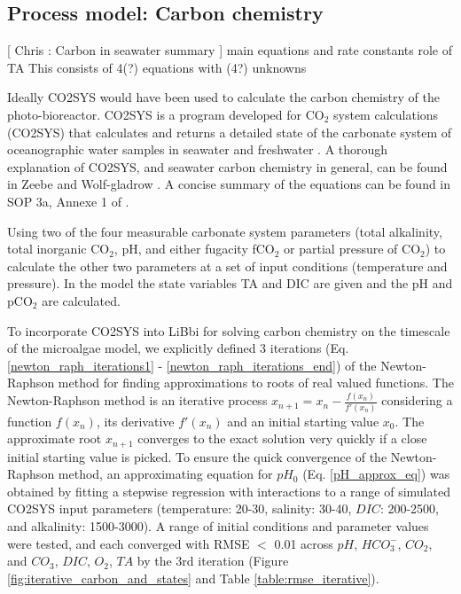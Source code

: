 \documentclass{ruthesis}
\begin{document}
\FloatBarrier
\subsection{Process model: Carbon chemistry}

[ Chris : Carbon in seawater summary ]
main equations and rate constants
role of TA
This consists of 4(?) equations with (4?) unknowns

Ideally CO2SYS \cite{lewis1998program} would have been used to calculate the carbon chemistry of the photo-bioreactor. 
CO2SYS is a program developed for CO$_2$ system calculations (CO2SYS) that calculates and returns a detailed state of the carbonate system of oceanographic water samples in seawater and freshwater \cite{lewis1998program}.
A thorough explanation of CO2SYS, and seawater carbon chemistry in general, can be found in  Zeebe and Wolf-gladrow \cite{zeebe2001co2}.  A concise summary of the equations can be found in SOP 3a, Annexe 1 of \cite{dickson2007guide}.

Using two of the four measurable carbonate system parameters (total alkalinity, total inorganic CO$_2$, pH, and either fugacity fCO$_2$ or partial pressure of CO$_2$) to calculate the other two parameters at a set of input conditions (temperature and pressure).  In the model the state variables TA and DIC are given and the pH and pCO$_2$ are calculated. 



To incorporate CO2SYS into LiBbi for solving carbon chemistry on the timescale of the microalgae model, we explicitly defined 3 iterations (Eq. \ref{newton_raph_iterations1} - \ref{newton_raph_iterations_end}) of the Newton-Raphson method for finding approximations to roots of real valued functions. The Newton-Raphson method is an iterative process 
$ x_{n+1} = x_n - \frac{f(x_n)}{f'(x_n)} $
considering a function $f(x_n)$, its derivative $f'(x_n)$ and an initial starting value $x_0$. The approximate root $x_{n+1}$ converges to the exact solution very quickly if a close initial starting value is picked. To ensure the quick convergence of the Newton-Raphson method, an approximating equation for $pH_0$ (Eq. \ref{pH_approx_eq}) was obtained by fitting a stepwise regression with interactions to a range of simulated CO2SYS input parameters (temperature: 20-30, salinity: 30-40, $DIC$: 200-2500, and alkalinity: 1500-3000). A range of initial conditions and parameter values were tested, and each converged with RMSE $<$ 0.01 across $pH$, $HCO_3^-$, $CO_2$, and $CO_3$, $DIC$, $O_2$, $TA$ by the 3rd iteration (Figure \ref{fig:iterative_carbon_and_states} and Table \ref{table:rmse_iterative}).
\end{document}
